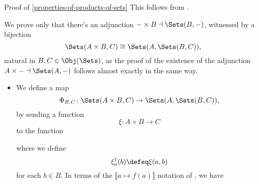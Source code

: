 \begin{Proof}{Proof of \cref{properties-of-products-of-sets}}%
    This follows from .

    We prove only that there's an adjunction $-\times B\dashv\Sets(B,-)$, witnessed by a bijection
    \[
        \Sets(A\times B,C)%
        \cong%
        \Sets(A,\Sets(B,C)),%
    \]%
    natural in $B,C\in\Obj(\Sets)$, as the proof of the existence of the adjunction $A\times-\dashv\Sets(A,-)$ follows almost exactly in the same way.%
    \begin{itemize}
        \item\label{proof-of-properties-of-products-of-sets-adjointness-1-1}We define a map
            \[
                \Phi_{B,C}%
                \colon%
                \Sets(A\times B,C)%
                \to%
                \Sets(A,\Sets(B,C)),%
            \]%
            by sending a function
            \[
                \xi%
                \colon%
                A\times B%
                \to%
                C%
            \]%
            to the function%
            \begin{webcompile}
                \phantom{\xi^{\dagger}\colon}
            \end{webcompile}
            where we define
            \[
                \xi^{\dagger}_{a}(b)%
                \defeq
                \xi(a,b)%
            \]%
            for each $b\in B$. In terms of the $\llbracket a\mapsto f(a)\rrbracket$ notation of , we have

\end{itemize}
\end{Proof}
